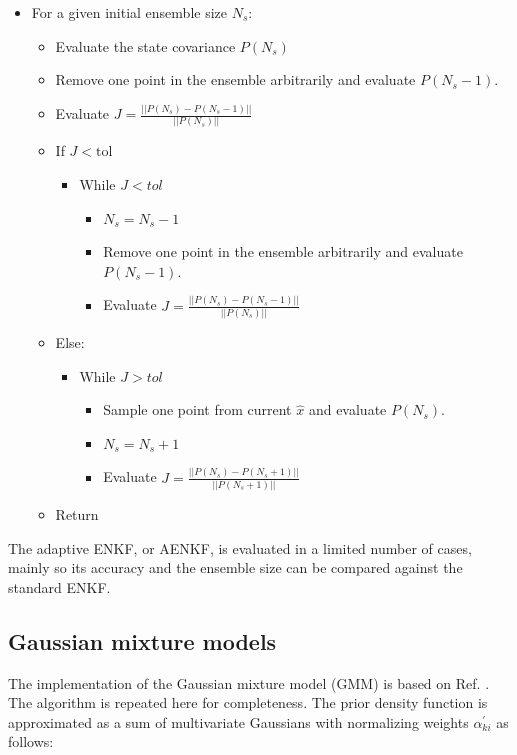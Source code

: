 \documentclass[]{article}
\begin{document}
\begin{itemize}
\item For a given initial ensemble size $N_s$:
	\begin{itemize}
	\item Evaluate the state covariance $P(N_s)$
	\item Remove one point in the ensemble arbitrarily and evaluate $P(N_s-1)$.
	\item Evaluate $J = \frac{|| P(N_s) - P(N_s-1)||}{||P(N_s)||}$
	\item If $J < \mathrm{tol}$
		\begin{itemize}
		\item While $J < \mathit{tol}$
			\begin{itemize}
			\item $N_s = N_s - 1$
			\item Remove one point in the ensemble arbitrarily and evaluate $P(N_s-1)$.
			\item Evaluate $J = \frac{|| P(N_s) - P(N_s-1)||}{||P(N_s)||}$
			\end{itemize}
		\end{itemize}
	\item Else:
		\begin{itemize}
		\item While $J > \mathit{tol}$
			\begin{itemize}
			\item Sample one point from current $\hat{x}$ and evaluate $P(N_s)$.
			\item $N_s = N_s + 1$
			\item Evaluate $J = \frac{|| P(N_s) - P(N_s+1)||}{||P(N_s+1)||}$
			\end{itemize}
		\end{itemize}
	\item Return
	\end{itemize}
\end{itemize}

The adaptive ENKF, or AENKF, is evaluated in a limited number of cases, mainly so its accuracy and the ensemble size can be compared against the standard ENKF.

\subsection{Gaussian mixture models}

The implementation of the Gaussian mixture model (GMM) is based on Ref. \cite{alspach}. The algorithm is repeated here for completeness. The prior density function is approximated as a sum of multivariate Gaussians with normalizing weights $\alpha_{ki}^{'}$ as follows:
\end{document}
